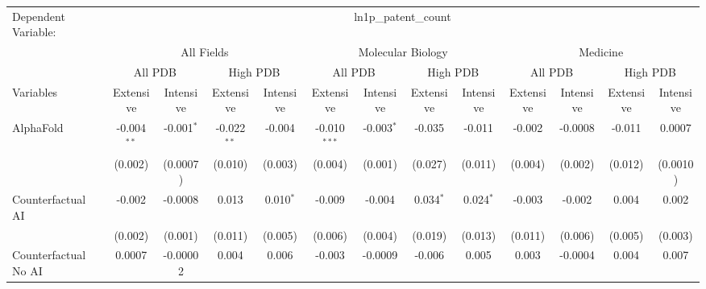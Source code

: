 \begingroup
\centering
\begin{tabular}{lcccccccccccc}
   \tabularnewline \midrule \midrule
   Dependent Variable: & \multicolumn{12}{c}{ln1p\_patent\_count}\\
 & \multicolumn{4}{c}{All Fields} & \multicolumn{4}{c}{Molecular Biology} & \multicolumn{4}{c}{Medicine} \\
\cmidrule(lr){2-5} \cmidrule(lr){6-9} \cmidrule(lr){10-13}
 & \multicolumn{2}{c}{All PDB} & \multicolumn{2}{c}{High PDB} & \multicolumn{2}{c}{All PDB} & \multicolumn{2}{c}{High PDB} & \multicolumn{2}{c}{All PDB} & \multicolumn{2}{c}{High PDB} \\
\cmidrule(lr){2-3} \cmidrule(lr){4-5} \cmidrule(lr){6-7} \cmidrule(lr){8-9} \cmidrule(lr){10-11} \cmidrule(lr){12-13}
Variables & \multicolumn{1}{c}{Extensive} & \multicolumn{1}{c}{Intensive} & \multicolumn{1}{c}{Extensive} & \multicolumn{1}{c}{Intensive} & \multicolumn{1}{c}{Extensive} & \multicolumn{1}{c}{Intensive} & \multicolumn{1}{c}{Extensive} & \multicolumn{1}{c}{Intensive} & \multicolumn{1}{c}{Extensive} & \multicolumn{1}{c}{Intensive} & \multicolumn{1}{c}{Extensive} & \multicolumn{1}{c}{Intensive} \\
\cmidrule(lr){1-1}\cmidrule(lr){2-2} \cmidrule(lr){3-3} \cmidrule(lr){4-4} \cmidrule(lr){5-5} \cmidrule(lr){6-6} \cmidrule(lr){7-7} \cmidrule(lr){8-8} \cmidrule(lr){9-9} \cmidrule(lr){10-10} \cmidrule(lr){11-11} \cmidrule(lr){12-12} \cmidrule(lr){13-13}
   AlphaFold                                & -0.004$^{**}$ & -0.001$^{*}$ & -0.022$^{**}$ & -0.004      & -0.010$^{***}$ & -0.003$^{*}$ & -0.035       & -0.011       & -0.002  & -0.0008 & -0.011  & 0.0007\\   
                                            & (0.002)       & (0.0007)     & (0.010)       & (0.003)     & (0.004)        & (0.001)      & (0.027)      & (0.011)      & (0.004) & (0.002) & (0.012) & (0.0010)\\   
   Counterfactual AI                        & -0.002        & -0.0008      & 0.013         & 0.010$^{*}$ & -0.009         & -0.004       & 0.034$^{*}$  & 0.024$^{*}$  & -0.003  & -0.002  & 0.004   & 0.002\\   
                                            & (0.002)       & (0.001)      & (0.011)       & (0.005)     & (0.006)        & (0.004)      & (0.019)      & (0.013)      & (0.011) & (0.006) & (0.005) & (0.003)\\   
   Counterfactual No AI                     & 0.0007        & -0.00002     & 0.004         & 0.006       & -0.003         & -0.0009      & -0.006       & 0.005        & 0.003   & -0.0004 & 0.004   & 0.007\\   

\end{tabular}
